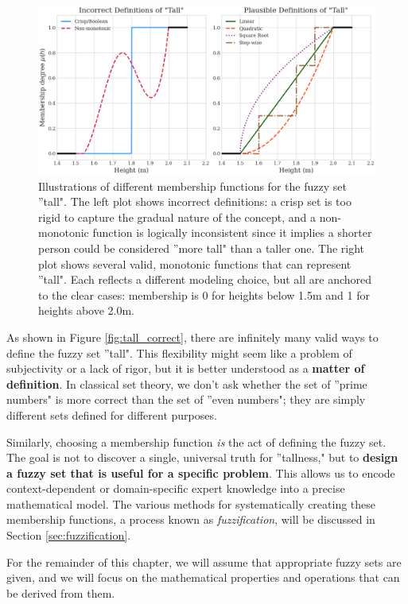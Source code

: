 \begin{figure}[!ht]
    \centering
    \includegraphics[width=\textwidth]{ch1/figures/Fuzzy_tall.png}
    \caption{Illustrations of different membership functions for the fuzzy set ''tall". The left plot shows incorrect definitions: a crisp set is too rigid to capture the gradual nature of the concept, and a non-monotonic function is logically inconsistent since it implies a shorter person could be considered ''more tall" than a taller one. The right plot shows several valid, monotonic functions that can represent ''tall". Each reflects a different modeling choice, but all are anchored to the clear cases: membership is 0 for heights below 1.5m and 1 for heights above 2.0m.}
    \label{fig:tall_definitions}
\end{figure}

As shown in Figure \ref{fig:tall_correct}, there are infinitely many valid ways to define the fuzzy set ''tall". This flexibility might seem like a problem of subjectivity or a lack of rigor, but it is better understood as a \textbf{matter of definition}. In classical set theory, we don't ask whether the set of ''prime numbers" is more correct than the set of ''even numbers"; they are simply different sets defined for different purposes. 

Similarly, choosing a membership function \emph{is} the act of defining the fuzzy set. The goal is not to discover a single, universal truth for ''tallness," but to \textbf{design a fuzzy set that is useful for a specific problem}. This allows us to encode context-dependent or domain-specific expert knowledge into a precise mathematical model. The various methods for systematically creating these membership functions, a process known as \textit{fuzzification}, will be discussed in Section \ref{sec:fuzzification}.

For the remainder of this chapter, we will assume that appropriate fuzzy sets are given, and we will focus on the mathematical properties and operations that can be derived from them.



